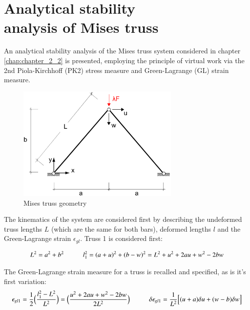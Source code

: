 
\chapter[Analytical stability analysis of Mises truss]{Analytical stability\\ analysis of Mises truss}
\label{app:Analytical stability analysis of Mises truss}

An analytical stability analysis of the Mises truss system considered in chapter \ref{chap:chapter_2_2} is presented, employing the principle of virtual work via the 2nd Piola-Kirchhoff (PK2) stress measure and Green-Lagrange (GL) strain measure.

\begin{figure}[H]
	\centering
	\def\svgwidth{\columnwidth}
	\includegraphics[width=8cm]{images/mises_truss_def.png}
	\caption{Mises truss geometry}
	\label{pic:app0}
\end{figure}

The kinematics of the system are considered first by describing the undeformed truss lengths $L$ (which are the same for both bars), deformed lengths $l$ and the Green-Lagrange strain $\epsilon_{gl}$. Truss 1 is considered first:

\begin{equation} 
L^2 = a^2 + b^2
\hspace{10mm}
l_1^2 = (a+u)^2 + (b-w)^2 = L^2 + u^2 + 2au +w^2 -2bw
\label{eqapp0_1}
\end{equation}

The Green-Lagrange strain measure for a truss is recalled and specified, as is it's first variation:
\begin{equation} 
\epsilon_{gl1} = \frac{1}{2}
\Big(\frac{l_1^2-L^2}{L^2}\Big)
=
\Big(\frac{u^2 + 2au +w^2 -2bw}{2L^2}\Big)
\hspace{10mm}
\delta\epsilon_{gl1} = 
\frac{1}{L^2}
\Big[
(u+a)\delta u
+
(w-b)\delta w
\Big]
\label{eqapp0_2}
\end{equation}

